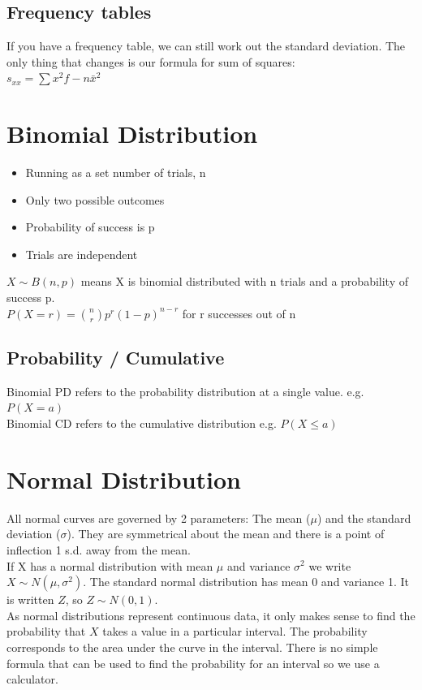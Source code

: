 \documentclass[a4paper,12pt]{article}
\begin{document}
\subsection*{Frequency tables}
If you have a frequency table, we can still work out the standard deviation. The only thing that changes is our formula for sum of squares: \\
$s_{xx} = \sum x^2f - n\bar{x}^2$ \\

\section*{Binomial Distribution}
\begin{itemize}
	\item Running as a set number of trials, n
	\item Only two possible outcomes
	\item Probability of success is p
	\item Trials are independent
\end{itemize}
$X \sim B(n,p)$ means X is binomial distributed with n trials and a probability of success p. \\
$P(X=r) = \binom{n}{r}p^r(1-p)^{n-r}$ for r successes out of n

\subsection*{Probability / Cumulative }
Binomial PD refers to the probability distribution at a single value. e.g. $P(X=a)$ \\
Binomial CD refers to the cumulative distribution e.g. $P(X \leqslant a)$\\

\section*{Normal Distribution}
All normal curves are governed by 2 parameters: The mean ($\mu$) and the standard deviation ($\sigma$). They are symmetrical about the mean and there is a point of inflection 1 s.d. away from the mean. \\

If X has a normal distribution with mean $\mu$ and variance $\sigma^2$ we write $X \sim N(\mu, \sigma^2)$. The standard normal distribution has mean 0 and variance 1. It is written $Z$, so $Z \sim N(0,1)$. \\

As normal distributions represent continuous data, it only makes sense to find the probability that $X$ takes a value in a particular interval. The probability corresponds to the area under the curve in the interval. There is no simple formula that can be used to find the probability for an interval so we use a calculator.  \\
\end{document}
